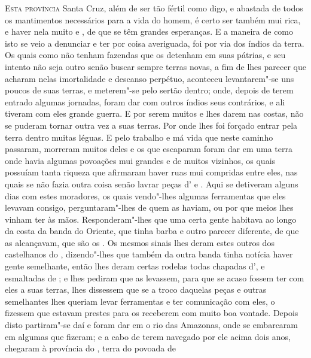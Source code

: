 \noindent\textsc{Esta província} Santa Cruz, além de ser tão fértil como digo, e abastada	%
de todos os mantimentos necessários para a vida do homem, é certo ser
também mui rica, e haver nela muito  e , de que se têm
grandes esperanças. E a maneira de como isto se veio a denunciar e ter				%
por coisa averiguada, foi por via dos índios da terra. Os quais como				%
não tenham fazendas que os detenham em suas pátrias, e seu intento não
seja outro senão buscar sempre terras novas, a fim de lhes parecer que
acharam nelas imortalidade e descanso perpétuo, aconteceu levantarem"-se
uns poucos de suas terras, e meterem"-se pelo sertão dentro; onde, depois
de terem entrado algumas jornadas, foram dar com outros índios seus
contrários, e ali tiveram com eles grande guerra. E por serem muitos e
lhes darem nas costas, não se puderam tornar outra vez a suas terras.
Por onde lhes foi forçado entrar pela terra dentro muitas léguas. E
pelo trabalho e má vida que neste caminho passaram, morreram muitos
deles e os que escaparam foram dar em uma terra onde havia algumas povoações
mui grandes e de muitos vizinhos, os quais possuíam tanta riqueza que afirmaram 
haver ruas mui compridas entre eles, nas quais se não fazia outra coisa senão lavrar
peças d' e . Aqui se detiveram alguns dias
com estes moradores, os quais vendo"-lhes algumas ferramentas
que eles levavam consigo, perguntaram"-lhes de quem as haviam, ou por que
meios lhes vinham ter às mãos. Responderam"-lhes que uma certa gente
habitava ao longo da costa da banda do Oriente, que tinha barba e outro			%
parecer diferente, de que as alcançavam, que são os . Os
mesmos sinais lhes deram estes outros dos castelhanos do ,			%
dizendo"-lhes que também da outra banda tinha notícia haver gente
semelhante, então lhes deram certas rodelas todas chapadas
d', e esmaltadas de ; e lhes pediram que
as levassem, para que se acaso fossem ter com eles a suas terras, lhes
dissessem que se a troco daquelas peças e outras semelhantes lhes
queriam levar ferramentas e ter comunicação com eles, o fizessem que			%
estavam prestes para os receberem com muito boa vontade. Depois disto
partiram"-se daí e foram dar em o rio das Amazonas, onde se embarcaram			%
em algumas  que fizeram; e a cabo de terem navegado por ele acima
dois anos, chegaram à província do , terra do  povoada de
